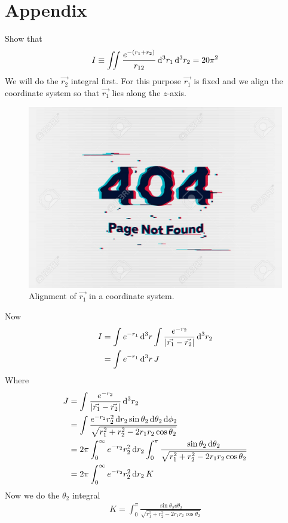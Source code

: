 	
	
	
	
	
	\section{Appendix}
	Show that
	\begin{align}
		\label{chapter21.eqn1-appendix}
		I \equiv \iint \frac{e^{-\qty(r_1 + r_2)}}{r_{1 2}} \dd[3]{r_1} \dd[3]{r_2} = 20 \pi^2
	\end{align}
	We will do the $\vec{r_2}$ integral first. For this purpose $\vec{r_1}$ is fixed and we align the coordinate system so that $\vec{r_1}$ lies along the $z$-axis.
	\begin{figure}
		\centering
		\includegraphics[width=0.5\linewidth]{Pictures/not-found.jpg}
		\caption{Alignment of $\vec{r_1}$ in a coordinate system.}
	\end{figure}
	Now
	\begin{align}
		I &= \int e^{-r_1} \dd[3]{r} \int \frac{e^{-r_2}}{\abs{\vec{r_1} - \vec{r_2}}} \dd[3]{r_2} \nonumber \\
		&= \int e^{-r_1} \dd[3]{r} J 
		\label{chapter21.eqn2-appendix}
	\end{align}
	Where
	\begin{align}
		J &= \int \frac{e^{-r_2}}{\abs{\vec{r_1} - \vec{r_2}}} \dd[3]{r_2} \nonumber\\
		&= \int \frac{e^{-r_2} r_2^2 \dd{r_2} \sin\theta_2 \dd{\theta_2} \dd{\phi_2}}{\sqrt{r_1^2 + r_2^2 - 2 r_1 r_2 \cos\theta_2}} \nonumber\\
		&= 2\pi \int_{0}^{\infty} e^{-r_2} r_2^2 \dd{r_2} \int_{0}^{\pi} \frac{\sin\theta_2\dd{\theta_2}}{\sqrt{r_1^2 + r_2^2 - 2 r_1 r_2 \cos\theta_2}} \nonumber\\
		\label{chapter21.eqn3-appendix}
		&= 2\pi \int_{0}^{\infty} e^{-r_2} r_2^2 \dd{r_2} K 
	\end{align}
	Now we do the $\theta_2$ integral
	\begin{align*}
		K = \int_{0}^{\pi} \frac{\sin\theta_2\dd{\theta_2}}{\sqrt{r_1^2 + r_2^2 - 2 r_1 r_2 \cos\theta_2}}
	\end{align*}

